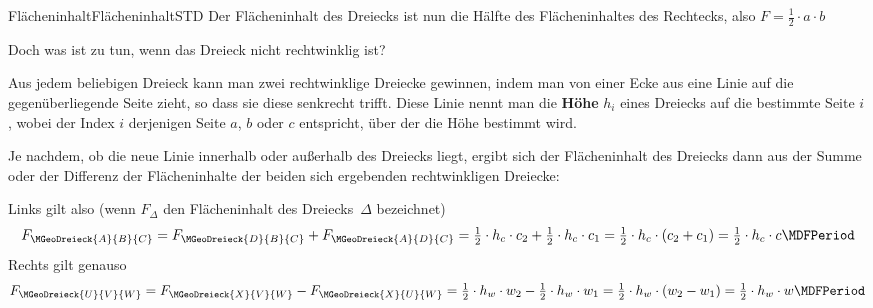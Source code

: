 \begin{MXContent}{Fl\"acheninhalt}{Fl\"acheninhalt}{STD}
Der Fl\"acheninhalt des Dreiecks ist nun die H\"alfte des Fl\"acheninhaltes 
des Rechtecks, also $ F = \frac{1}{2}\cdot a\cdot b$

Doch was ist zu tun,
wenn das Dreieck nicht rechtwinklig ist?

Aus jedem beliebigen Dreieck kann man zwei rechtwinklige Dreiecke gewinnen,
indem man von einer Ecke aus eine Linie auf die gegen\"uberliegende Seite zieht,
so dass sie diese senkrecht trifft. Diese Linie nennt man die 
\textbf{H\"ohe} $h_{i}$ eines Dreiecks auf die bestimmte Seite $i$, wobei 
der Index $i$ derjenigen Seite $a$, $b$ oder $c$ entspricht, \"uber der die 
H\"ohe bestimmt wird.

Je nachdem, ob die neue Linie innerhalb oder au\ss erhalb des Dreiecks liegt, 
ergibt sich der Fl\"acheninhalt des Dreiecks dann aus der Summe oder der 
Differenz der Fl\"acheninhalte der beiden sich ergebenden rechtwinkligen 
Dreiecke:
\begin{center}
\hspace{4em}
\end{center}

Links gilt also (wenn $F_{\Delta}$ den Fl\"acheninhalt des Dreiecks~$\Delta$ 
bezeichnet)
\[
   F_{\MGeoDreieck{A}{B}{C}}
 = F_{\MGeoDreieck{D}{B}{C}} + F_{\MGeoDreieck{A}{D}{C}}
 = \Mtfrac{1}{2} \cdot h_c \cdot c_2 + \Mtfrac{1}{2} \cdot h_c \cdot c_1
 = \Mtfrac{1}{2} \cdot h_c \cdot \left( c_2 + c_1 \right)
 = \Mtfrac{1}{2} \cdot h_c \cdot c \MDFPeriod
\]
Rechts gilt genauso
\[
   F_{\MGeoDreieck{U}{V}{W}}
 = F_{\MGeoDreieck{X}{V}{W}} - F_{\MGeoDreieck{X}{U}{W}}
 = \Mtfrac{1}{2} \cdot h_w \cdot w_2 - \Mtfrac{1}{2} \cdot h_w \cdot w_1
 = \Mtfrac{1}{2} \cdot h_w \cdot \left( w_2 - w_1 \right)
 = \Mtfrac{1}{2} \cdot h_w \cdot w \MDFPeriod
\]


\end{MXContent}
